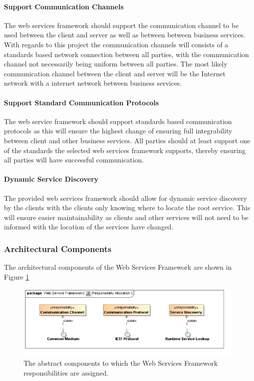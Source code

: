 \paragraph{Support Communication Channels}
The web services framework should support the communication channel to be used
between the client and server as well as between between business services.
With regards to this project the communication channels will consists of a
standards based network connection between all parties, with the communication
channel not necessarily being uniform between all parties. The most likely
communication channel between the client and server will be the Internet
network with a internet network between business services.

\paragraph{Support Standard Communication Protocols}
The web service framework should support standards based communication
protocols as this will ensure the highest change of ensuring full
integrability between client and other business services. All parties should
at least support one of the standards the selected web services framework
supports, thereby ensuring all parties will have successful communication.

\paragraph{Dynamic Service Discovery}
The provided web services framework should allow for dynamic service discovery
by the clients with the clients only knowing where to locate the root service.
This will ensure easier maintainability as clients and other services will not
need to be informed with the location of the services have changed.

\subsubsection{Architectural Components}
The architectural components of the Web Services Framework are shown in Figure \ref{fig:webServicesFrameworkResponsibilityAllocation}
\begin{figure}[H]
	\begin{center}
	\includegraphics[scale=0.5]{../Diagrams and Charts/Web Services Framework/ResponsibilityAllocation.jpg}
	\caption{The abstract components to which the Web Services Framework responsibilities are assigned.}
	\label{fig:webServicesFrameworkResponsibilityAllocation}
	\end{center}
\end{figure}

